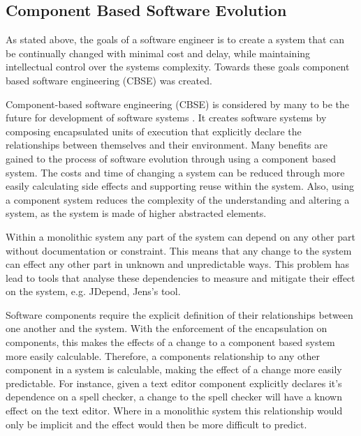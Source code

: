 \subsection{Component Based Software Evolution}
As stated above, the goals of a software engineer is to create a system that can be continually changed with minimal cost and delay,
while maintaining intellectual control over the systems complexity.
Towards these goals component based software engineering (CBSE) was created.

Component-based software engineering (CBSE) is considered by many to be the future for development of software systems \cite{Szyperski2002}.
It creates software systems by composing encapsulated units of execution that explicitly declare the relationships between themselves and their environment.
Many benefits are gained to the process of software evolution through using a component based system. 
The costs and time of changing a system can be reduced through more easily calculating side effects and supporting reuse within the system.
Also, using a component system reduces the complexity of the understanding and altering a system, as the system is made of higher abstracted elements. 

Within a monolithic system any part of the system can depend on any other part without documentation or constraint.
This means that any change to the system can effect any other part in unknown and unpredictable ways.
This problem has lead to tools that analyse these dependencies to measure and mitigate their effect on the system, e.g. JDepend, Jens's tool.

Software components require the explicit definition of their relationships between one another and the system. 
With the enforcement of the encapsulation on components, this makes the effects of a change to a component based system more easily calculable.
Therefore, a components relationship to any other component in a system is calculable, making the effect of a change more easily predictable.
For instance, given a text editor component explicitly declares it's dependence on a spell checker, a change to the spell checker will have a known effect on the text editor.
Where in a monolithic system this relationship would only be implicit and the effect would then be more difficult to predict.

